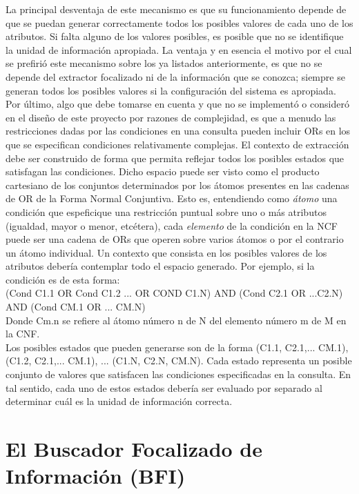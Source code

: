 La principal desventaja de este mecanismo es que su funcionamiento depende de que se puedan generar correctamente todos los posibles valores de cada uno de los atributos. Si falta alguno de los valores posibles, es posible que no se identifique la unidad de información apropiada. La ventaja y en esencia el motivo por el cual se prefirió este mecanismo sobre los ya listados anteriormente, es que no se depende del extractor focalizado ni de la información que se conozca; siempre se generan todos los posibles valores si la configuración del sistema es apropiada. \\

Por último, algo que debe tomarse en cuenta y que no se implementó o consideró en el diseño de este proyecto por razones de complejidad, es que a menudo las restricciones dadas por las condiciones en una consulta pueden incluir ORs en los que se especifican condiciones relativamente complejas. El contexto de extracción debe ser construido de forma que permita reflejar todos los posibles estados que satisfagan las condiciones. Dicho espacio puede ser visto como el producto cartesiano de los conjuntos determinados por los átomos presentes en las cadenas de OR de la Forma Normal Conjuntiva. Esto es, entendiendo como \emph{átomo} una condición que espeficique una restricción puntual sobre uno o más atributos (igualdad, mayor o menor, etcétera), cada \emph{elemento} de la condición en la NCF puede ser una cadena de ORs que operen sobre varios átomos o por el contrario un átomo individual. Un contexto que consista en los posibles valores de los atributos debería contemplar todo el espacio generado. Por ejemplo, si la condición es de esta forma: \\

(Cond C1.1 OR Cond C1.2 ...  OR COND C1.N) AND (Cond C2.1 OR ...C2.N) AND (Cond CM.1 OR ... CM.N) \\

Donde Cm.n se refiere al átomo número n de N del elemento número m de M en la CNF. \\

Los posibles estados que pueden generarse son de la forma (C1.1, C2.1,... CM.1), (C1.2, C2.1,... CM.1), ... (C1.N, C2.N, CM.N). Cada estado representa un posible conjunto de valores que satisfacen las condiciones especificadas en la consulta. En tal sentido, cada uno de estos estados debería ser evaluado por separado al determinar cuál es la unidad de información correcta. \\

\section{El Buscador Focalizado de Información (BFI)}\label{sect:diseno-BFI}

